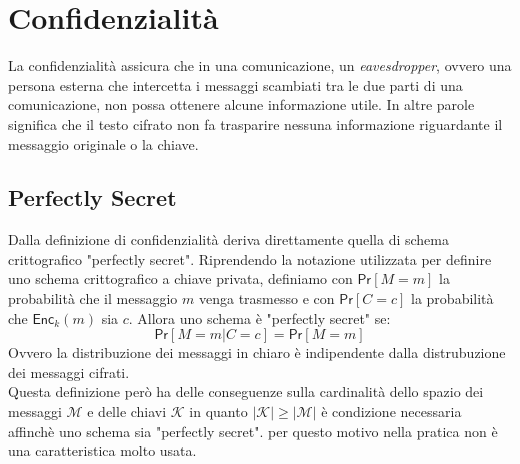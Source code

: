 \section{Confidenzialità}
La confidenzialità assicura che in una comunicazione, un \emph{eavesdropper}, ovvero una persona esterna che intercetta i messaggi scambiati tra le due parti di una comunicazione, non possa ottenere alcune informazione utile. In altre parole significa che il testo cifrato non fa trasparire nessuna informazione riguardante il messaggio originale o la chiave.\\
\subsection{Perfectly Secret}
Dalla definizione di confidenzialità deriva direttamente quella di schema crittografico "perfectly secret". Riprendendo la notazione utilizzata per definire uno schema crittografico a chiave privata, definiamo con $\mathsf{Pr}[M = m]$ la probabilità che il messaggio $m$ venga trasmesso e con $\mathsf{Pr}[C = c]$ la probabilità che $\mathsf{Enc}_k(m)$ sia $c$. Allora uno schema è "perfectly secret" se:
$$
    \mathsf{Pr}[M = m | C = c] = \mathsf{Pr}[M = m]
$$
Ovvero la distribuzione dei messaggi in chiaro è indipendente dalla distrubuzione dei messaggi cifrati.\\
Questa definizione però ha delle conseguenze sulla cardinalità dello spazio dei messaggi $\mathcal{M}$ e delle chiavi $\mathcal{K}$ in quanto $|\mathcal{K}| \geq |\mathcal{M}|$ è condizione necessaria affinchè uno schema sia "perfectly secret". per questo motivo nella pratica non è una caratteristica molto usata.

